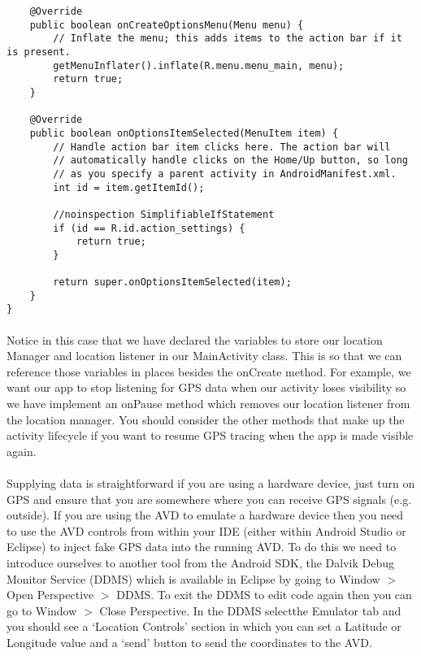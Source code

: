 \begin{lstlisting}
    @Override
    public boolean onCreateOptionsMenu(Menu menu) {
        // Inflate the menu; this adds items to the action bar if it is present.
        getMenuInflater().inflate(R.menu.menu_main, menu);
        return true;
    }

    @Override
    public boolean onOptionsItemSelected(MenuItem item) {
        // Handle action bar item clicks here. The action bar will
        // automatically handle clicks on the Home/Up button, so long
        // as you specify a parent activity in AndroidManifest.xml.
        int id = item.getItemId();

        //noinspection SimplifiableIfStatement
        if (id == R.id.action_settings) {
            return true;
        }

        return super.onOptionsItemSelected(item);
    }
}
\end{lstlisting}

\paragraph{} Notice in this case that we have declared the variables to store our location Manager and location listener in our MainActivity class. This is so that we can reference those variables in places besides the onCreate method. For example, we want our app to stop listening for GPS data when our activity loses visibility so we have implement an onPause method which removes our location listener from the location manager. You should consider the other methods that make up the activity lifecycle if you want to resume GPS tracing when the app is made visible again.

\paragraph{} Supplying data is straightforward if you are using a hardware device, just turn on GPS and ensure that you are somewhere where you can receive GPS signals (e.g. outside). If you are using the AVD to emulate a hardware device then you need to use the AVD controls from within your IDE (either within Android Studio or Eclipse) to inject fake GPS data into the running AVD. To do this we need to introduce ourselves to another tool from the Android SDK, the Dalvik Debug Monitor Service (DDMS) which is available in Eclipse by going to Window $>$ Open Perspective $>$ DDMS. To exit the DDMS to edit code again then you can go to Window $>$ Close Perspective. In the DDMS selectthe Emulator tab and you should see a `Location Controls' section in which you can set a Latitude or Longitude value and a `send' button to send the coordinates to the AVD.

